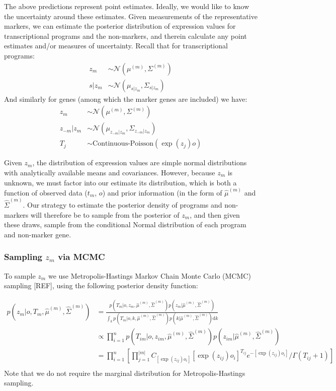 \documentclass[10pt]{article}
\begin{document}
The above predictions represent point estimates. Ideally, we would like to know the uncertainty around these estimates. Given measurements of the representative markers, we can estimate the posterior distribution of expression values for transcriptional programs and the non-markers, and therein calculate any point estimates and/or measures of uncertainty. Recall that for transcriptional programs: 
\begin{align*}
z_m & \sim \mathcal{N}\left(\mu^{(m)}, \Sigma^{(m)} \right) \\
s|z_m & \sim \mathcal{N}(\mu_{s|z_m}, \Sigma_{s|z_m}) 
\end{align*}
And similarly for genes (among which the marker genes are included) we have: 
\begin{align*}
z_m & \sim \mathcal{N}(\mu^{(m)}, \Sigma^{(m)}) \\
z_{-m}|z_m & \sim \mathcal{N}(\mu_{z_{-m}|z_m}, \Sigma_{z_{-m}|z_m}) \\
T_j & \sim \textrm{Continuous-Poisson}(\exp(z_j)o)
\end{align*}

Given $z_m$, the distribution of expression values are simple normal distributions with analytically available means and covariances. However, because $z_m$ is unknown, we must factor into our estimate its distribution, which is both a function of observed data ($t_m$, $o$) and prior information (in the form of $\hat{\mu}^{(m)}$ and $\hat{\Sigma}^{(m)}$. Our strategy  to estimate the posterior density of programs and non-markers will therefore be to sample from the posterior of $z_m$, and then given these draws, sample from the conditional Normal distribution of each program and non-marker gene.

\subsubsection{Sampling $z_m$ via MCMC} 

To sample $z_m$ we use Metropolis-Hastings Markov Chain Monte Carlo (MCMC) sampling [REF], using the following posterior density function:

\begin{align*}
p(z_m| o, T_m, \hat{\mu}^{(m)}, \hat{\Sigma}^{(m)}) & =  \frac{p(T_m | o, z_m, \hat{\mu}^{(m)}, \hat{\Sigma}^{(m)}) p(z_m| \hat{\mu}^{(m)}, \hat{\Sigma}^{(m)}) }{ \int_k  p(T_m | o, k, \hat{\mu}^{(m)}, \hat{\Sigma}^{(m)}) p(k | \hat{\mu}^{(m)}, \hat{\Sigma}^{(m)}) \textrm{d}k } \\
& \propto \prod_{i=1}^{n}  p(T_{im} | o, z_{im}, \hat{\mu}^{(m)}, \hat{\Sigma}^{(m)}) p(z_{im}| \hat{\mu}^{(m)}, \hat{\Sigma}^{(m)}) \\
& = \prod_{i=1}^{n} \left[ \prod_{j=1}^{|m|} C_{[\exp(z_{ij})o_i]} [\exp(z_{ij})o_i]^{T_{ij}}  e^{-[\exp(z_{ij})o_i]} / \Gamma(T_{ij} + 1) \right] \\ 
\end{align*}
Note that we do not require the marginal distribution for Metropolis-Hastings sampling. 
\end{document}
